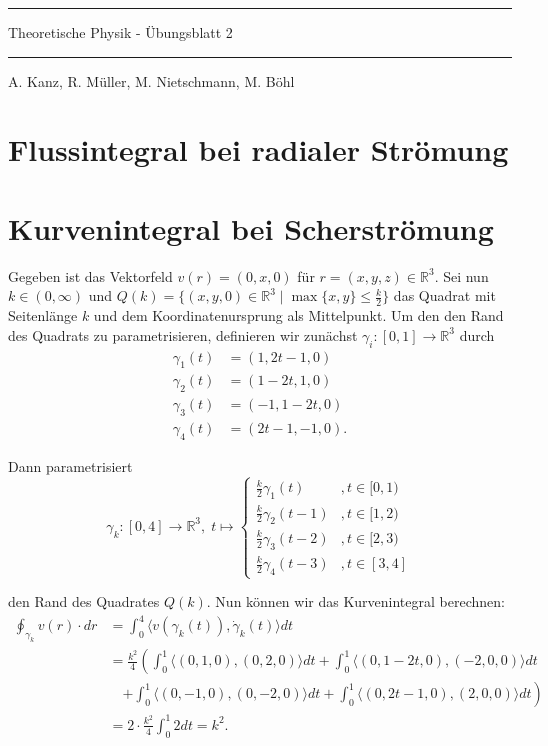 \documentclass[11pt]{article}
\theoremstyle{plain}
\theoremstyle{definition}
\newcommand{\R}{\mathbb{R}}
\newcommand{\longto}{\longrightarrow}
\begin{document}
\pagestyle{fancy}
\thispagestyle{plain}

\rule{\textwidth}{.5pt}
\begin{center}
\Huge{Theoretische Physik - Übungsblatt 2}
\end{center}

\rule{\textwidth}{.5pt}
\text{} \hfill A. Kanz, R. Müller, M. Nietschmann, M. Böhl



\section{Flussintegral bei radialer Strömung}


\section{Kurvenintegral bei Scherströmung}
Gegeben ist das Vektorfeld $v(r) = (0, x, 0)$ für $r = (x,y,z) \in \R^3$. Sei nun $k \in (0, \infty)$ und $Q(k) = \{ (x,y,0) \in \R^3 \mid \max \{ x,y \} \leq \frac{k}{2} \}$ das Quadrat mit Seitenlänge $k$ und dem Koordinatenursprung als Mittelpunkt. Um den den Rand des Quadrats zu parametrisieren, definieren wir zunächst $\gamma_i : [0,1] \longto \R^3$ durch
\begin{align*}
\gamma_1 (t) &= (1, 2t-1, 0)\\
\gamma_2 (t) &= (1-2t, 1, 0)\\
\gamma_3 (t) &= (-1, 1-2t, 0)\\
\gamma_4 (t) &= (2t-1, -1, 0).
\end{align*}

Dann parametrisiert
\[ \gamma_k: [0,4] \longto \R^3,\; t \longmapsto \begin{cases}
\tfrac{k}{2}\gamma_1(t) &, t \in [0,1)\\
\tfrac{k}{2}\gamma_2(t-1) &, t \in [1,2)\\
\tfrac{k}{2}\gamma_3(t-2) &, t \in [2,3)\\
\tfrac{k}{2}\gamma_4(t-3) &, t \in [3,4]
\end{cases} \]

den Rand des Quadrates $Q(k)$. Nun können wir das Kurvenintegral berechnen:
\begin{align*}
\oint_{\gamma_k} v(r)\cdot dr &= \int_0^4 \langle v(\gamma_k(t)), \dot \gamma_k (t) \rangle dt \\
&= \frac{k^2}{4} \left( \int_0^1 \langle (0,1,0), (0,2,0) \rangle dt + \int_0^1 \langle (0, 1-2t, 0), (-2,0,0) \rangle dt \right.\\
&\quad \left. + \int_0^1 \langle (0,-1,0), (0,-2,0) \rangle dt + \int_0^1 \langle (0, 2t-1, 0), (2,0,0) \rangle dt \right)\\
&= 2\cdot\frac{k^2}{4} \int_0^1 2 dt = k^2.
\end{align*}
\end{document}
